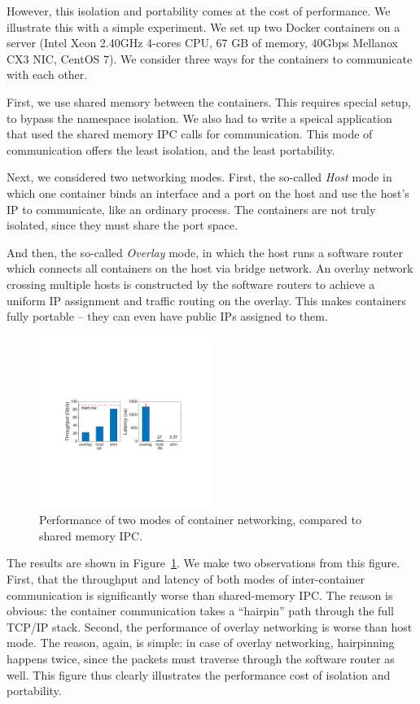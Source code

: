 However, this isolation and portability comes at the cost of performance. We
illustrate this with a simple experiment.  We set up two Docker containers on a
server (Intel Xeon 2.40GHz 4-cores CPU, 67 GB of memory, 40Gbps Mellanox CX3
NIC, CentOS 7). We consider three ways for the containers to communicate with
each other. 

First, we use shared memory between the containers. This requires special setup,
to bypass the namespace isolation. We also had to write a speical application
that used the shared memory IPC calls for communication. This mode of
communication offers the least isolation, and the least portability. 

Next, we considered two networking modes. First, the so-called {\em Host} mode
in which one container binds an interface and a port on the host and use the
host's IP to communicate, like an ordinary process.  The containers are not
truly isolated, since they must share the port space.

And then, the so-called {\em Overlay} mode, in which the host runs a software
router which connects all containers on the host via bridge network. An overlay
network crossing multiple hosts is constructed by the software routers to
achieve a uniform IP assignment and traffic routing on the overlay. This makes
containers fully portable -- they can even have public IPs assigned to them. 

\begin{figure}[ht]
     \centering 
     \includegraphics[width=0.5\textwidth]{figures/intro/intro_exist2.pdf} 
     \caption{Performance of two modes of container networking, compared to
     shared memory IPC.} 
     \label{fig:three_modes} 
\end{figure} 

The results are shown in Figure~\ref{fig:three_modes}. We make two observations from this figure. First, that the throughput and
latency of both modes of inter-container communication is significantly worse
than shared-memory IPC. The reason is obvious: the container communication takes
a ``hairpin'' path through the full TCP/IP stack. Second, the performance of
overlay networking is worse than host mode. The reason, again, is simple: in
case of overlay networking, hairpinning happens twice, since the packets must
traverse through the software router as well. This figure thus clearly
illustrates the performance cost of isolation and portability.

